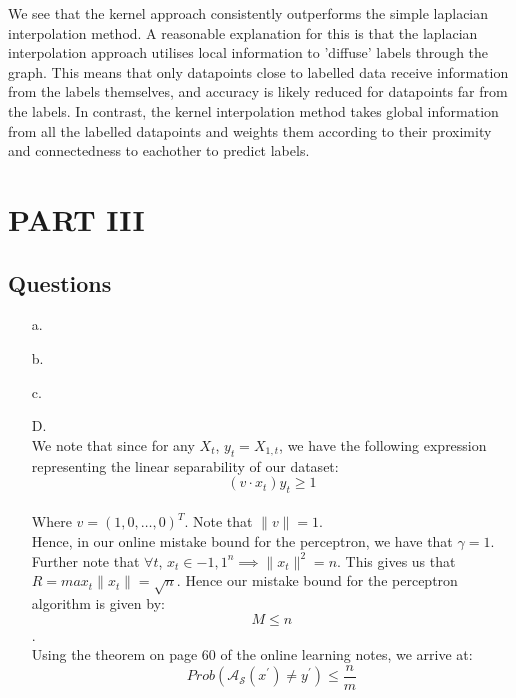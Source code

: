 \documentclass[12pt]{article}
\begin{document}
We see that the kernel approach consistently outperforms the simple laplacian
 interpolation method. A reasonable explanation for this is that the laplacian
interpolation approach utilises local information to 'diffuse' labels through the graph. 
This means that only datapoints close to labelled data receive information from the 
labels themselves, and accuracy is likely reduced for datapoints far from the labels.
In contrast, the kernel interpolation method takes global information from all the 
labelled datapoints and weights them according to their proximity and connectedness 
to eachother to predict labels.
\newpage



\section{PART III}
\subsection{Questions}
\begin{itemize}
    \item[a.]
    \item[b.]
    \item[c.]
    \item[D.]\\
    We note that since for any $X_{t}$, $y_{t} = X_{1,t}$, we have the following
     expression representing the linear separability of our dataset:\\
    \[(v \cdot x_{t})y_{t} \ge 1\]\\
    Where $v = (1,0, \dots, 0)^{T}$. Note that $\|v\| =1$.\\
    Hence, in our online mistake bound for the perceptron, we have that $\gamma =1$.
    Further note that $\forall t$, $x_{t} \in {-1,1}^{n} \implies \|x_{t}\|^{2}
    = n$. This gives us that $R = max_{t} \|x_{t}\| = \sqrt{n}$.
    Hence our mistake bound for the perceptron algorithm is given by:\\
    
    \[M \le n \].\\

    Using the theorem on page 60 of the online learning notes, we arrive at:\\

    \[Prob(\mathcal{A_{S}}(x ^{\prime}) \ne y^{\prime} ) \le \frac{n}{m}\]\\

     
\end{itemize}
\end{document}
